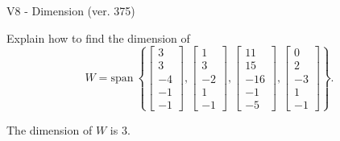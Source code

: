 \begin{exercise}
  \begin{exerciseTitle}V8 - Dimension (ver. 375)\end{exerciseTitle}
  \begin{exerciseStatement}
    Explain how to find the dimension of 
\[W=\mathrm{span}\ \left\{\left[\begin{array}{r}
3 \\
3 \\
-4 \\
-1 \\
-1
\end{array}\right] , \left[\begin{array}{r}
1 \\
3 \\
-2 \\
1 \\
-1
\end{array}\right] , \left[\begin{array}{r}
11 \\
15 \\
-16 \\
-1 \\
-5
\end{array}\right] , \left[\begin{array}{r}
0 \\
2 \\
-3 \\
1 \\
-1
\end{array}\right]\right\}.\]



  \end{exerciseStatement}
  \begin{exerciseAnswer}
   The dimension of \(W\) is  \(3\).
  


  \end{exerciseAnswer}
\end{exercise}